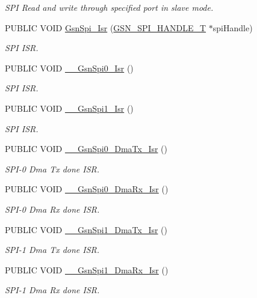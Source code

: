 \begin{DoxyCompactItemize}
\begin{DoxyCompactList}\small\item\em SPI Read and write through specified port in slave mode. \end{DoxyCompactList}\item 
PUBLIC VOID \hyperlink{a00655_ga91cf5c4e81e474090b72a663d3d437bd}{GsnSpi\_\-Isr} (\hyperlink{a00238}{GSN\_\-SPI\_\-HANDLE\_\-T} $\ast$spiHandle)
\begin{DoxyCompactList}\small\item\em SPI ISR. \end{DoxyCompactList}\item 
PUBLIC VOID \hyperlink{a00655_ga585c3c7cf57beb1410b51729bbdf825c}{\_\-\_\-GsnSpi0\_\-Isr} ()
\begin{DoxyCompactList}\small\item\em SPI ISR. \end{DoxyCompactList}\item 
PUBLIC VOID \hyperlink{a00655_ga352836cc21d953411e38fb2e90d01ac9}{\_\-\_\-GsnSpi1\_\-Isr} ()
\begin{DoxyCompactList}\small\item\em SPI ISR. \end{DoxyCompactList}\item 
PUBLIC VOID \hyperlink{a00655_ga43402383d3c4b3bb50c9c34b88002a3c}{\_\-\_\-GsnSpi0\_\-DmaTx\_\-Isr} ()
\begin{DoxyCompactList}\small\item\em SPI-\/0 Dma Tx done ISR. \end{DoxyCompactList}\item 
PUBLIC VOID \hyperlink{a00655_gaba6d8c77f5e7adba7afcf924c990f566}{\_\-\_\-GsnSpi0\_\-DmaRx\_\-Isr} ()
\begin{DoxyCompactList}\small\item\em SPI-\/0 Dma Rx done ISR. \end{DoxyCompactList}\item 
PUBLIC VOID \hyperlink{a00655_gae57fcc9dca6abd4efbe45a144676b268}{\_\-\_\-GsnSpi1\_\-DmaTx\_\-Isr} ()
\begin{DoxyCompactList}\small\item\em SPI-\/1 Dma Tx done ISR. \end{DoxyCompactList}\item 
PUBLIC VOID \hyperlink{a00655_ga3c3d0c3affa07b1b86fe208055666de6}{\_\-\_\-GsnSpi1\_\-DmaRx\_\-Isr} ()
\begin{DoxyCompactList}\small\item\em SPI-\/1 Dma Rx done ISR. \end{DoxyCompactList}\item 

\end{DoxyCompactItemize}
